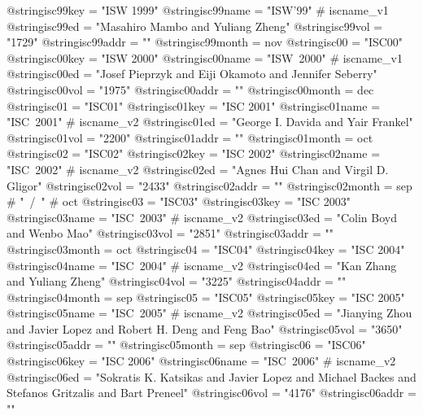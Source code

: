 @string{isc99key =              "ISW 1999"}
@string{isc99name =             "ISW'99" # iscname_v1}
@string{isc99ed =               "Masahiro Mambo and Yuliang Zheng"}
@string{isc99vol =              "1729"}
@string{isc99addr =             ""}
@string{isc99month =            nov}
@string{isc00 =                 "ISC00"}
@string{isc00key =              "ISW 2000"}
@string{isc00name =             "ISW~2000" # iscname_v1}
@string{isc00ed =               "Josef Pieprzyk and Eiji Okamoto and Jennifer Seberry"}
@string{isc00vol =              "1975"}
@string{isc00addr =             ""}
@string{isc00month =            dec}
@string{isc01 =                 "ISC01"}
@string{isc01key =              "ISC 2001"}
@string{isc01name =             "ISC~2001" # iscname_v2}
@string{isc01ed =               "George I. Davida and Yair Frankel"}
@string{isc01vol =              "2200"}
@string{isc01addr =             ""}
@string{isc01month =            oct}
@string{isc02 =                 "ISC02"}
@string{isc02key =              "ISC 2002"}
@string{isc02name =             "ISC~2002" # iscname_v2}
@string{isc02ed =               "Agnes Hui Chan and Virgil D. Gligor"}
@string{isc02vol =              "2433"}
@string{isc02addr =             ""}
@string{isc02month =            sep # "~/~" # oct}
@string{isc03 =                 "ISC03"}
@string{isc03key =              "ISC 2003"}
@string{isc03name =             "ISC~2003" # iscname_v2}
@string{isc03ed =               "Colin Boyd and Wenbo Mao"}
@string{isc03vol =              "2851"}
@string{isc03addr =             ""}
@string{isc03month =            oct}
@string{isc04 =                 "ISC04"}
@string{isc04key =              "ISC 2004"}
@string{isc04name =             "ISC~2004" # iscname_v2}
@string{isc04ed =               "Kan Zhang and Yuliang Zheng"}
@string{isc04vol =              "3225"}
@string{isc04addr =             ""}
@string{isc04month =            sep}
@string{isc05 =                 "ISC05"}
@string{isc05key =              "ISC 2005"}
@string{isc05name =             "ISC~2005" # iscname_v2}
@string{isc05ed =               "Jianying Zhou and Javier Lopez and Robert H. Deng and Feng Bao"}
@string{isc05vol =              "3650"}
@string{isc05addr =             ""}
@string{isc05month =            sep}
@string{isc06 =                 "ISC06"}
@string{isc06key =              "ISC 2006"}
@string{isc06name =             "ISC~2006" # iscname_v2}
@string{isc06ed =               "Sokratis K. Katsikas and Javier Lopez and Michael Backes and Stefanos Gritzalis and Bart Preneel"}
@string{isc06vol =              "4176"}
@string{isc06addr =             ""}

